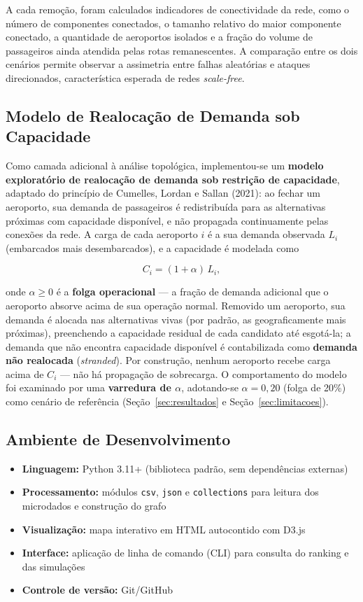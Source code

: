 \documentclass[12pt,a4paper]{article}
\begin{document}
A cada remoção, foram calculados indicadores de conectividade da rede, como o número de componentes
conectados, o tamanho relativo do maior componente conectado, a quantidade de aeroportos isolados e
a fração do volume de passageiros ainda atendida pelas rotas remanescentes. A comparação entre os
dois cenários permite observar a assimetria entre falhas aleatórias e ataques direcionados,
característica esperada de redes \textit{scale-free}.

\subsection{Modelo de Realocação de Demanda sob Capacidade}
\label{sec:capacidade}

Como camada adicional à análise topológica, implementou-se um \textbf{modelo exploratório de
realocação de demanda sob restrição de capacidade}, adaptado do princípio de Cumelles, Lordan e
Sallan (2021): ao fechar um aeroporto, sua demanda de passageiros é redistribuída para as
alternativas próximas com capacidade disponível, e não propagada continuamente pelas conexões da
rede. A carga de cada aeroporto $i$ é a sua demanda observada $L_i$ (embarcados mais
desembarcados), e a capacidade é modelada como

\begin{equation}
  C_i = (1 + \alpha)\,L_i,
\end{equation}

\noindent onde $\alpha \ge 0$ é a \textbf{folga operacional} --- a fração de demanda adicional que
o aeroporto absorve acima de sua operação normal. Removido um aeroporto, sua demanda é alocada nas
alternativas vivas (por padrão, as geograficamente mais próximas), preenchendo a capacidade
residual de cada candidato até esgotá-la; a demanda que não encontra capacidade disponível é
contabilizada como \textbf{demanda não realocada} (\textit{stranded}). Por construção, nenhum
aeroporto recebe carga acima de $C_i$ --- não há propagação de sobrecarga. O comportamento do
modelo foi examinado por uma \textbf{varredura de $\alpha$}, adotando-se $\alpha = 0{,}20$ (folga
de 20\%) como cenário de referência (Seção~\ref{sec:resultados} e Seção~\ref{sec:limitacoes}).

\subsection{Ambiente de Desenvolvimento}

\begin{itemize}[leftmargin=*]
  \item \textbf{Linguagem:} Python 3.11+ (biblioteca padrão, sem dependências externas)
  \item \textbf{Processamento:} módulos \texttt{csv}, \texttt{json} e \texttt{collections} para
        leitura dos microdados e construção do grafo
  \item \textbf{Visualização:} mapa interativo em HTML autocontido com D3.js
  \item \textbf{Interface:} aplicação de linha de comando (CLI) para consulta do ranking e das
        simulações
  \item \textbf{Controle de versão:} Git/GitHub
\end{itemize}
\end{document}
